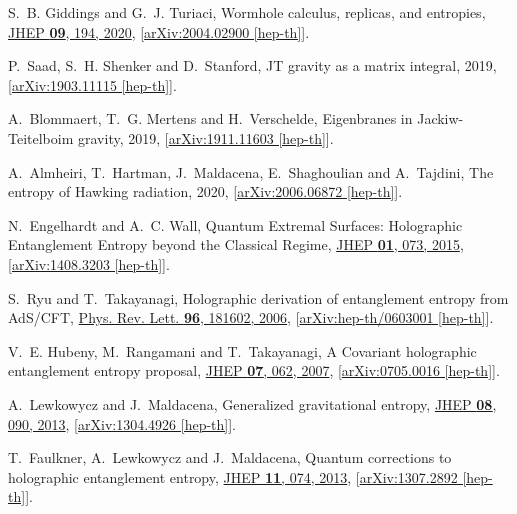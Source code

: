 \documentclass[12pt]{article}
\numberwithin{equation}{section}
\begin{document}
\begin{thebibliography}{10}
S.~B. Giddings and G.~J. Turiaci, {{Wormhole calculus, replicas, and
  entropies}}, \href{http://dx.doi.org/10.1007/JHEP09(2020)194}{JHEP {\bf 09},
  194, 2020}, [\href{http://arxiv.org/abs/arXiv:2004.02900}{{arXiv:2004.02900
  [hep-th]}}].

P.~Saad, S.~H. Shenker and D.~Stanford, {{JT gravity as a matrix integral}},
  2019, [\href{http://arxiv.org/abs/arXiv:1903.11115}{{arXiv:1903.11115
  [hep-th]}}].

A.~Blommaert, T.~G. Mertens and H.~Verschelde, {{Eigenbranes in
  Jackiw-Teitelboim gravity}},  2019,
  [\href{http://arxiv.org/abs/arXiv:1911.11603}{{arXiv:1911.11603 [hep-th]}}].

A.~Almheiri, T.~Hartman, J.~Maldacena, E.~Shaghoulian and A.~Tajdini, {{The
  entropy of Hawking radiation}},  2020,
  [\href{http://arxiv.org/abs/arXiv:2006.06872}{{arXiv:2006.06872 [hep-th]}}].

N.~Engelhardt and A.~C. Wall, {{Quantum Extremal Surfaces: Holographic
  Entanglement Entropy beyond the Classical Regime}},
  \href{http://dx.doi.org/10.1007/JHEP01(2015)073}{JHEP {\bf 01}, 073, 2015},
  [\href{http://arxiv.org/abs/arXiv:1408.3203}{{arXiv:1408.3203 [hep-th]}}].

S.~Ryu and T.~Takayanagi, {{Holographic derivation of entanglement entropy from
  AdS/CFT}}, \href{http://dx.doi.org/10.1103/PhysRevLett.96.181602}{Phys. Rev.
  Lett. {\bf 96}, 181602, 2006},
  [\href{http://arxiv.org/abs/arXiv:hep-th/0603001}{{arXiv:hep-th/0603001
  [hep-th]}}].

V.~E. Hubeny, M.~Rangamani and T.~Takayanagi, {{A Covariant holographic
  entanglement entropy proposal}},
  \href{http://dx.doi.org/10.1088/1126-6708/2007/07/062}{JHEP {\bf 07}, 062,
  2007}, [\href{http://arxiv.org/abs/arXiv:0705.0016}{{arXiv:0705.0016
  [hep-th]}}].

A.~Lewkowycz and J.~Maldacena, {{Generalized gravitational entropy}},
  \href{http://dx.doi.org/10.1007/JHEP08(2013)090}{JHEP {\bf 08}, 090, 2013},
  [\href{http://arxiv.org/abs/arXiv:1304.4926}{{arXiv:1304.4926 [hep-th]}}].

T.~Faulkner, A.~Lewkowycz and J.~Maldacena, {{Quantum corrections to
  holographic entanglement entropy}},
  \href{http://dx.doi.org/10.1007/JHEP11(2013)074}{JHEP {\bf 11}, 074, 2013},
  [\href{http://arxiv.org/abs/arXiv:1307.2892}{{arXiv:1307.2892 [hep-th]}}].


\end{thebibliography}
\end{document}
